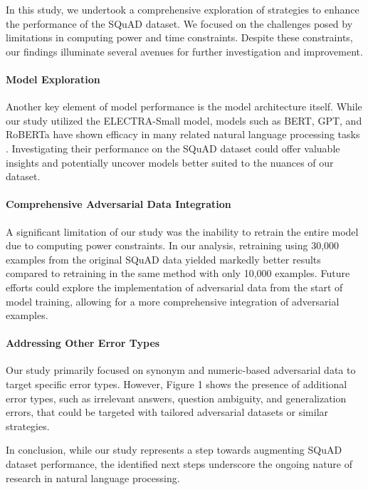 \documentclass{article}
\begin{document}
In this study, we undertook a comprehensive exploration of strategies
to enhance the performance of the SQuAD dataset. We focused on the
challenges posed by limitations in computing power and time constraints.
Despite these constraints, our findings illuminate several avenues for
further investigation and improvement.

\paragraph{Model Exploration}

Another key element of model performance is the model architecture itself.
While our study utilized the ELECTRA-Small model, models such as BERT, GPT,
and RoBERTa have shown efficacy in many related natural language processing
tasks \cite{wallace2019universal,liu2019roberta}. Investigating their
performance on the SQuAD dataset could offer valuable insights and potentially
uncover models better suited to the nuances of our dataset.

\paragraph{Comprehensive Adversarial Data Integration}

A significant limitation of our study was the inability to retrain the entire
model due to computing power constraints. In our analysis, retraining using
30,000 examples from the original SQuAD data yielded markedly better results
compared to retraining in the same method with only 10,000 examples. Future
efforts could explore the implementation of adversarial data from the start
of model training, allowing for a more comprehensive integration of adversarial
examples.

\paragraph{Addressing Other Error Types}

Our study primarily focused on synonym and numeric-based adversarial data to
target specific error types. However, Figure 1 shows the presence of additional
error types, such as irrelevant answers, question ambiguity, and generalization
errors, that could be targeted with tailored adversarial datasets or similar
strategies.

In conclusion, while our study represents a step towards augmenting SQuAD
dataset performance, the identified next steps underscore the ongoing nature
of research in natural language processing.
\end{document}
